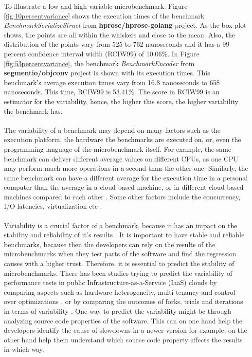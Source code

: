 \documentclass{seal_thesis}
\begin{document}
\noindent To illustrate a low and high variable microbenchmark: Figure \ref{fig:10percentvariance} shows the execution times of the benchmark \textit{BenchmarkSerializeStruct} from \textbf{hprose/hprose-golang} project\cite{hprose/hprose-golang}. As the box plot shows, the points are all within the whiskers and close to the mean. Also, the distribution of the points vary from 525 to 762 nanoseconds and it has a 99 percent confidence interval width (RCIW99) of 10.06\%. In Figure \ref{fig:53percentvariance}, the benchmark \textit{BenchmarkEncoder} from \textbf{segmentio/objconv} project \cite{segmentio/objconv} is shown with its execution times. This benchmark's average execution times vary from 16.8 nanoseconds to 658 nanoseconds. This time, RCIW99 is 53.41\%. The  score in RCIW99 is an estimator for the variability, hence, the higher this score, the higher variability the benchmark has.\\
\\
The variability of a benchmark may depend on many factors such as the execution platform, the hardware the benchmarks are executed on, or, even the programming language of the microbenchmark itself\cite{laaber2018performance}. For example, the same benchmark can deliver different average values on different CPUs, as one CPU may perform much more operations in a second than the other one. Similarly, the same benchmark can have a different average for the execution time in a personal computer than the average in a cloud-based machine, or in different cloud-based machines compared to each other \cite{laaber2019software}. Some other factors include the concurrency, I/O latencies, virtualization etc \cite{laaber2019software}. \\
\\
Variability is a crucial factor of a benchmark, because it has an impact on the stability and reliability of it's results \cite{Laaber:2018:EOS:3196398.3196407}. It is important to have stable and reliable benchmarks, because then the developers can rely on the results of the microbenchmarks when they test parts of the software and find the regression causes with a higher trust. Therefore, it is essential to predict the stability of microbenchmarks. There has been studies trying to predict the variability of performance tests in public Infrastructure-as-a-Service (IaaS) clouds by comparing aspects such as hardware heterogeneity, multi-tenancy and control over optimizations \cite{Leitner:2016:PCS:2926746.2885497}, or by comparing the outcomes of forks, trials and iterations in terms of variability \cite{laaber2019software}. One way to predict the variability might be through analyzing source code properties of the software. This can on one hand help the developers identify the cause of slowdowns in a newer version for example, on the other hand help them understand which source code property affects the results in which way.\\
\end{document}
